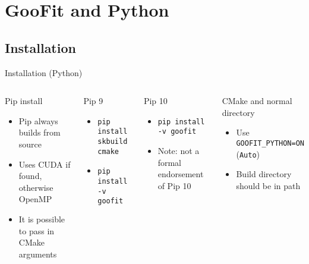 \documentclass[aspectratio=169, smaller]{beamer}
\begin{document}
\section{GooFit and Python}
\subsection{Installation}
\begin{frame}{Installation (Python)}

    \begin{columns}[c]
        \begin{block}{Pip install}
            \begin{itemize}
                \item Pip always builds from source
                \item Uses CUDA if found, otherwise OpenMP
                \item It is possible to pass in CMake arguments
            \end{itemize}
        \end{block}

        \begin{block}{Pip 9}
            \begin{itemize}
                \item \texttt{pip install skbuild cmake}
                \item \texttt{pip install -v goofit}
            \end{itemize}
        \end{block}

        \begin{block}{Pip 10}
            \begin{itemize}
                \item \texttt{pip install -v goofit}
                \item Note: not a formal endorsement of Pip 10
            \end{itemize}
        \end{block}


        \begin{block}{CMake and normal directory}
            \begin{itemize}
                \item Use \texttt{GOOFIT\_PYTHON=ON} (\texttt{Auto})
                \item Build directory should be in path
            \end{itemize}
        \end{block}


\end{columns}
\end{frame}
\end{document}
